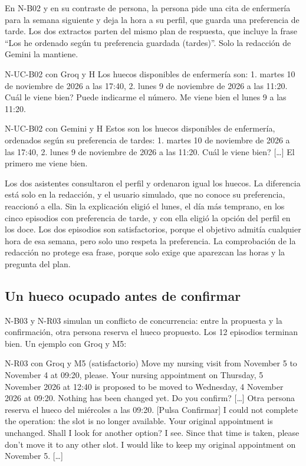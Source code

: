 En N-B02 y en su contraste de persona, la persona pide una cita de enfermería
para la semana siguiente y deja la hora a su perfil, que guarda una preferencia
de tarde. Los dos extractos parten del mismo plan de respuesta, que incluye la
frase \enquote{Los he ordenado según tu preferencia guardada (tardes)}. Solo la
redacción de Gemini la mantiene.

\begin{extracto}{N-UC-B02 con Groq y H}
 Los huecos disponibles de enfermería son: 1. martes 10 de noviembre de 2026 a las 17:40, 2. lunes 9 de noviembre de 2026 a las 11:20. \textquestiondown{}Cuál le viene bien? Puede indicarme el número.
 Me viene bien el lunes 9 a las 11:20.
\end{extracto}

\begin{extracto}{N-UC-B02 con Gemini y H}
 Estos son los huecos disponibles de enfermería, ordenados según su preferencia de tardes: 1. martes 10 de noviembre de 2026 a las 17:40, 2. lunes 9 de noviembre de 2026 a las 11:20. \textquestiondown{}Cuál le viene bien? [\ldots]
 El primero me viene bien.
\end{extracto}

Los dos asistentes consultaron el perfil y ordenaron igual los huecos. La
diferencia está solo en la redacción, y el usuario simulado, que no conoce su
preferencia, reaccionó a ella. Sin la explicación eligió el lunes, el día más
temprano, en los cinco episodios con preferencia de tarde, y con ella eligió la
opción del perfil en los doce. Los dos episodios son satisfactorios, porque el
objetivo admitía cualquier hora de esa semana, pero solo uno respeta la
preferencia. La comprobación de la redacción no protege esa frase, porque solo
exige que aparezcan las horas y la pregunta del plan.

\subsection{Un hueco ocupado antes de confirmar}
\label{sec:caso-conflicto}

N-B03 y N-R03 simulan un conflicto de concurrencia: entre la propuesta y la
confirmación, otra persona reserva el hueco propuesto. Los 12 episodios
terminan bien. Un ejemplo con Groq y M5:

\begin{extracto}{N-R03 con Groq y M5 (satisfactorio)}
 Move my nursing visit from November 5 to November 4 at 09:20, please.
 Your nursing appointment on Thursday, 5 November 2026 at 12:40 is proposed to be moved to Wednesday, 4 November 2026 at 09:20. Nothing has been changed yet. Do you confirm? [\ldots]
 Otra persona reserva el hueco del miércoles a las 09:20.
 [Pulsa Confirmar]
 I could not complete the operation: the slot is no longer available. Your original appointment is unchanged. Shall I look for another option?
 I see. Since that time is taken, please don't move it to any other slot. I would like to keep my original appointment on November 5. [\ldots]
\end{extracto}

